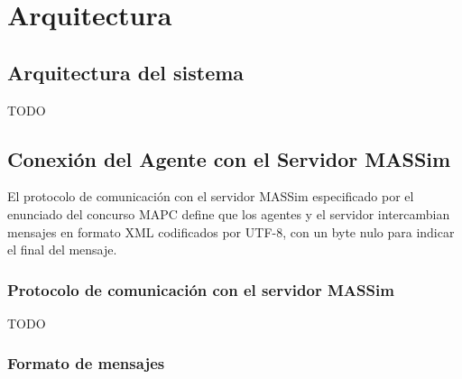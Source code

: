 
\chapter{Arquitectura}
\label{chap:Arquitectura}


\section{Arquitectura del sistema}
\label{sec:arquitectura_sistema}

 TODO 

\section[Conexión con el MASSim Server]
{Conexión del Agente con el Servidor MASSim}
\label{sec:conexion_massim}

 El protocolo de comunicación con el servidor MASSim especificado por 
 el enunciado del concurso MAPC define que los agentes y el servidor 
 intercambian mensajes en formato XML codificados por UTF-8, con un 
 byte nulo para indicar el final del mensaje. 

\subsection[Protocolo del MASSim Server]
{Protocolo de comunicación con el servidor MASSim}
\label{sub:protocolo_massim}

 TODO

\subsection{Formato de mensajes}
\label{sub:formato_mensajes}

